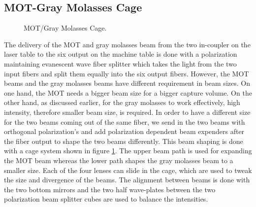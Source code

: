 \subsection{MOT-Gray Molasses Cage}\label{exp:mot-cage}
\begin{figure}
  \begin{center}
  \end{center}
  \caption{MOT/Gray Molasses Cage.}
  \label{mot-cage-design}
\end{figure}
The delivery of the MOT and gray molasses beam from the two in-coupler on the laser table to the six output on the machine table is done with a polarization maintaining evanescent wave fiber splitter which takes the light from the two input fibers and split them equally into the six output fibers. However, the MOT beams and the gray molasses beams have different requirement in beam sizes. On one hand, the MOT needs a bigger beam size for a bigger capture volume. On the other hand, as discussed earlier, for the gray molasses to work effectively, high intensity, therefore smaller beam size, is required. In order to have a different size for the two beams coming out of the same fiber, we send in the two beams with orthogonal polarization's and add polarization dependent beam expenders after the fiber output to shape the two beams differently. This beam shaping is done with a cage system shown in figure \ref{mot-cage-design}. The upper beam path is used for expanding the MOT beam whereas the lower path shapes the gray molasses beam to a smaller size. Each of the four lenses can slide in the cage, which are used to tweak the size and divergence of the beams. The alignment between beams is done with the two bottom mirrors and the two half wave-plates between the two polarization beam splitter cubes are used to balance the intensities.

